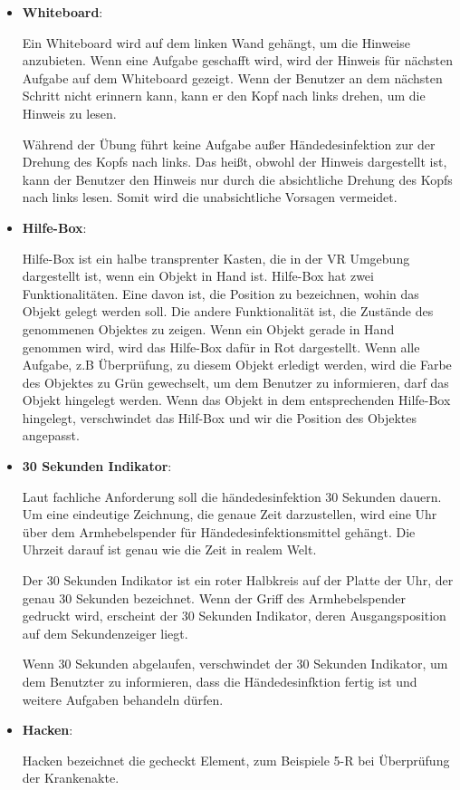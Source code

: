   \begin{itemize}
      \item \textbf{Whiteboard}:
      
      Ein Whiteboard wird auf dem linken Wand gehängt, um die Hinweise anzubieten. Wenn eine Aufgabe geschafft wird, wird der Hinweis für nächsten Aufgabe auf dem Whiteboard gezeigt. Wenn der Benutzer an dem nächsten Schritt nicht erinnern kann, kann er den Kopf nach links drehen, um die Hinweis zu lesen.
      
      Während der Übung führt keine Aufgabe außer Händedesinfektion zur der Drehung des Kopfs nach links. Das heißt, obwohl der Hinweis dargestellt ist, kann der Benutzer den Hinweis nur durch die absichtliche Drehung des Kopfs nach links lesen. Somit wird die unabsichtliche Vorsagen vermeidet.
      
      \item \textbf{Hilfe-Box}:
      
      Hilfe-Box ist ein halbe transprenter Kasten, die in der VR Umgebung dargestellt ist, wenn ein Objekt in Hand ist. Hilfe-Box hat zwei Funktionalitäten. Eine davon ist, die Position zu bezeichnen, wohin das Objekt gelegt werden soll. Die andere Funktionalität ist, die Zustände des genommenen Objektes zu zeigen. Wenn ein Objekt gerade in Hand genommen wird, wird das Hilfe-Box dafür in Rot dargestellt. Wenn alle Aufgabe, z.B Überprüfung, zu diesem Objekt erledigt werden,  wird die Farbe des Objektes zu Grün gewechselt, um dem Benutzer zu informieren, darf das Objekt hingelegt werden. Wenn das Objekt in dem entsprechenden Hilfe-Box hingelegt, verschwindet das Hilf-Box und wir die Position des Objektes angepasst.
      
      \item \textbf{30 Sekunden Indikator}:
      
      Laut fachliche Anforderung soll die händedesinfektion 30 Sekunden dauern. Um eine eindeutige Zeichnung, die genaue Zeit darzustellen, wird eine Uhr über dem Armhebelspender für Händedesinfektionsmittel gehängt. Die Uhrzeit darauf ist genau wie die Zeit in realem Welt.
      
      Der 30 Sekunden Indikator ist ein roter Halbkreis auf der Platte der Uhr, der genau 30 Sekunden bezeichnet. Wenn der Griff des Armhebelspender gedruckt wird, erscheint der 30 Sekunden Indikator, deren Ausgangsposition auf dem Sekundenzeiger liegt.
      
      Wenn 30 Sekunden abgelaufen, verschwindet der 30 Sekunden Indikator, um dem Benutzter zu informieren, dass die Händedesinfktion fertig ist und weitere Aufgaben behandeln dürfen.
      
      \item \textbf{Hacken}:
      
      Hacken bezeichnet die gecheckt Element, zum Beispiele 5-R bei Überprüfung der Krankenakte.
  \end{itemize}
  
